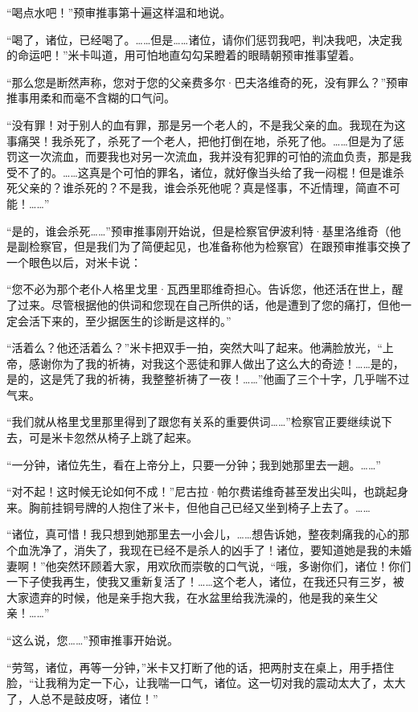 \par “喝点水吧！”预审推事第十遍这样温和地说。
\par “喝了，诸位，已经喝了。……但是……诸位，请你们惩罚我吧，判决我吧，决定我的命运吧！”米卡叫道，用可怕地直勾勾呆瞪着的眼睛朝预审推事望着。
\par “那么您是断然声称，您对于您的父亲费多尔·巴夫洛维奇的死，没有罪么？”预审推事用柔和而毫不含糊的口气问。
\par “没有罪！对于别人的血有罪，那是另一个老人的，不是我父亲的血。我现在为这事痛哭！我杀死了，杀死了一个老人，把他打倒在地，杀死了他。……但是为了惩罚这一次流血，而要我也对另一次流血，我并没有犯罪的可怕的流血负责，那是我受不了的。……这真是个可怕的罪名，诸位，就好像当头给了我一闷棍！但是谁杀死父亲的？谁杀死的？不是我，谁会杀死他呢？真是怪事，不近情理，简直不可能！……”
\par “是的，谁会杀死……”预审推事刚开始说，但是检察官伊波利特·基里洛维奇（他是副检察官，但是我们为了简便起见，也准备称他为检察官）在跟预审推事交换了一个眼色以后，对米卡说：
\par “您不必为那个老仆人格里戈里·瓦西里耶维奇担心。告诉您，他还活在世上，醒了过来。尽管根据他的供词和您现在自己所供的话，他是遭到了您的痛打，但他一定会活下来的，至少据医生的诊断是这样的。”
\par “活着么？他还活着么？”米卡把双手一拍，突然大叫了起来。他满脸放光，“上帝，感谢你为了我的祈祷，对我这个恶徒和罪人做出了这么大的奇迹！……是的，是的，这是凭了我的祈祷，我整整祈祷了一夜！……”他画了三个十字，几乎喘不过气来。
\par “我们就从格里戈里那里得到了跟您有关系的重要供词……”检察官正要继续说下去，可是米卡忽然从椅子上跳了起来。
\par “一分钟，诸位先生，看在上帝分上，只要一分钟；我到她那里去一趟。……”
\par “对不起！这时候无论如何不成！”尼古拉·帕尔费诺维奇甚至发出尖叫，也跳起身来。胸前挂铜号牌的人抱住了米卡，但他自己已经又坐到椅子上去了。……
\par “诸位，真可惜！我只想到她那里去一小会儿，……想告诉她，整夜刺痛我的心的那个血洗净了，消失了，我现在已经不是杀人的凶手了！诸位，要知道她是我的未婚妻啊！”他突然环顾着大家，用欢欣而崇敬的口气说，“哦，多谢你们，诸位！你们一下子使我再生，使我又重新复活了！……这个老人，诸位，在我还只有三岁，被大家遗弃的时候，他是亲手抱大我，在水盆里给我洗澡的，他是我的亲生父亲！……”
\par “这么说，您……”预审推事开始说。
\par “劳驾，诸位，再等一分钟，”米卡又打断了他的话，把两肘支在桌上，用手捂住脸，“让我稍为定一下心，让我喘一口气，诸位。这一切对我的震动太大了，太大了，人总不是鼓皮呀，诸位！”
